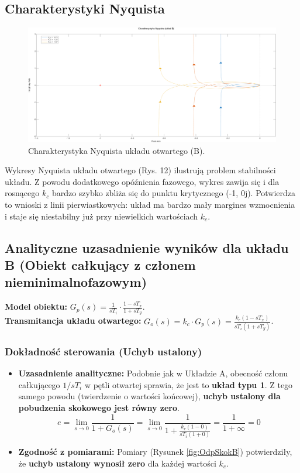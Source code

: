 \documentclass[12pt,a4paper]{article}
\begin{document}
	\subsection{Charakterystyki Nyquista}
	
	\begin{figure}[H]
		\centering
		\includegraphics[width=0.8\linewidth]{zdjecia/NQ_ukladB.png}
		\caption{Charakterystyka Nyquista układu otwartego (B).}
		\label{fig:NQ_ukladB}
	\end{figure}
	
	Wykresy Nyquista układu otwartego (Rys. 12) ilustrują problem stabilności układu. Z powodu dodatkowego opóźnienia fazowego, wykres zawija się i dla rosnącego $k_c$ bardzo szybko zbliża się do punktu krytycznego (-1, 0j). Potwierdza to wnioski z linii pierwiastkowych: układ ma bardzo mały margines wzmocnienia i staje się niestabilny już przy niewielkich wartościach $k_c$.
	
	\subsection{Analityczne uzasadnienie wyników dla układu B (Obiekt całkujący z członem nieminimalnofazowym)}
	
	\textbf{Model obiektu:} $G_p(s) = \frac{1}{sT_i} \cdot \frac{1 - sT_x}{1 + sT_y}$. \\
	\textbf{Transmitancja układu otwartego:} $G_o(s) = k_c \cdot G_p(s) = \frac{k_c (1 - sT_x)}{sT_i (1 + sT_y)}$.
	
	\subsubsection{Dokładność sterowania (Uchyb ustalony)}
	\begin{itemize}
		\item \textbf{Uzasadnienie analityczne:} Podobnie jak w Układzie A, obecność członu całkującego $1/sT_i$ w pętli otwartej sprawia, że jest to \textbf{układ typu 1}. Z tego samego powodu (twierdzenie o wartości końcowej), \textbf{uchyb ustalony dla pobudzenia skokowego jest równy zero}.
		\[
		e = \lim_{s \to 0} \frac{1}{1 + G_o(s)} = \lim_{s \to 0} \frac{1}{1 + \frac{k_c(1 - 0)}{sT_i(1 + 0)}} = \frac{1}{1 + \infty} = 0
		\]
		\item \textbf{Zgodność z pomiarami:} Pomiary (Rysunek \ref{fig:OdpSkokB}) potwierdziły, że \textbf{uchyb ustalony wynosił zero} dla każdej wartości $k_c$.
	\end{itemize}
	
\end{document}
